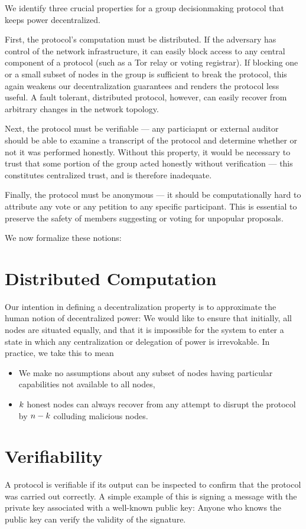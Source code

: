 We identify three crucial properties for a group decisionmaking protocol that
keeps power decentralized.

First, the protocol's computation must be distributed. If the adversary has
control of the network infrastructure, it can easily block access to any central
component of a protocol (such as a Tor relay \tocite or voting
registrar). If blocking one or a small
subset of nodes in the group is sufficient to break the protocol, this again
weakens our decentralization guarantees and renders the protocol less useful. A
fault tolerant, distributed protocol, however, can easily recover from arbitrary
changes in the network topology.

Next, the protocol must be verifiable --- any particiapnt or external auditor
should be able to examine a transcript of the protocol and determine whether or
not it was performed honestly. Without this property, it would be necessary to
trust that some portion of the group acted honestly without verification ---
this constitutes centralized trust, and is therefore inadequate.

Finally, the protocol must be anonymous --- it should be computationally hard to
attribute any vote or any petition to any specific participant. This is
essential to preserve the safety of members suggesting or voting for unpopular
proposals.

We now formalize these notions:
\section{Distributed Computation}\label{Subsection:distr}
Our intention in defining a decentralization property is to approximate the
human notion of decentralized power: We would like to ensure that initially, all
nodes are situated equally, and that it is impossible for the system to enter a
state in which any centralization or delegation of power is irrevokable. In
practice, we take this to mean
\begin{itemize}
  \item We make no assumptions about any subset of nodes having particular
    capabilities not available to all nodes,
  \item $k$ honest nodes can always recover from any attempt to disrupt
    the protocol by $n - k$ colluding malicious nodes.
\end{itemize}

\section{Verifiability}\label{Section:verif}
A protocol is verifiable if its output can be inspected to confirm that the
protocol was carried out correctly. A simple example of this is signing a
message with the private key associated with a well-known public key: Anyone
who knows the public key can verify the validity of the signature.


